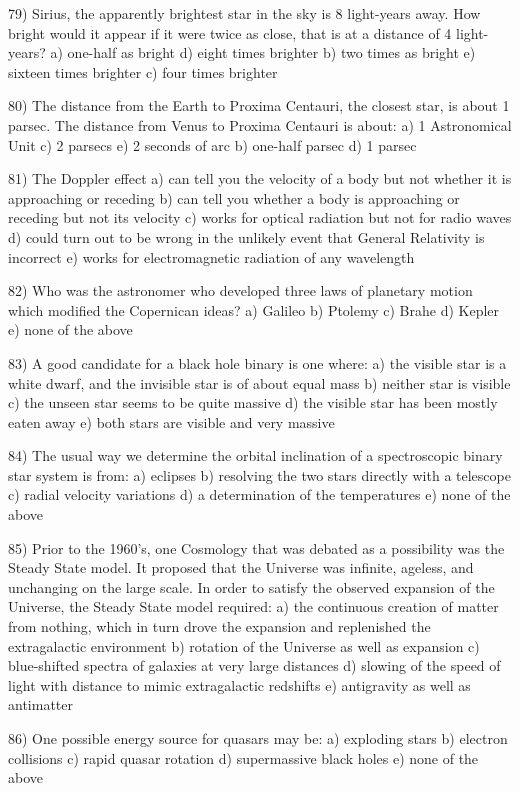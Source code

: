 79) Sirius, the apparently brightest star in the sky is 8 light-years away.
How bright would it appear if it were twice as close, that is at a distance
of 4 light-years?
a) one-half as bright d) eight times brighter
b) two times as bright e) sixteen times brighter
c) four times brighter

80) The distance from the Earth to Proxima Centauri, the closest star, is about
1 parsec. The distance from Venus to Proxima Centauri is about:
a) 1 Astronomical Unit c) 2 parsecs e) 2 seconds of arc
b) one-half parsec d) 1 parsec

81) The Doppler effect
a) can tell you the velocity of a body but not whether it is approaching
or receding
b) can tell you whether a body is approaching or receding but not its
velocity
c) works for optical radiation but not for radio waves
d) could turn out to be wrong in the unlikely event that General Relativity
is incorrect
e) works for electromagnetic radiation of any wavelength

82) Who was the astronomer who developed three laws of planetary motion
which modified the Copernican ideas?
a) Galileo b) Ptolemy c) Brahe d) Kepler e) none of the above

83) A good candidate for a black hole binary is one where:
a) the visible star is a white dwarf, and the invisible star is
of about equal mass
b) neither star is visible
c) the unseen star seems to be quite massive
d) the visible star has been mostly eaten away
e) both stars are visible and very massive

84) The usual way we determine the orbital inclination of a spectroscopic
binary star system is from:
a) eclipses b) resolving the two stars directly with a telescope
c) radial velocity variations d) a determination of the temperatures
e) none of the above

85) Prior to the 1960's, one Cosmology that was debated as a possibility was
the Steady State model. It proposed that the Universe was infinite,
ageless, and unchanging on the large scale. In order to satisfy the
observed expansion of the Universe, the Steady State model required:
a) the continuous creation of matter from nothing, which in turn drove the
expansion and replenished the extragalactic environment
b) rotation of the Universe as well as expansion
c) blue-shifted spectra of galaxies at very large distances
d) slowing of the speed of light with distance to mimic extragalactic
redshifts
e) antigravity as well as antimatter

86) One possible energy source for quasars may be:
a) exploding stars b) electron collisions
c) rapid quasar rotation d) supermassive black holes
e) none of the above

